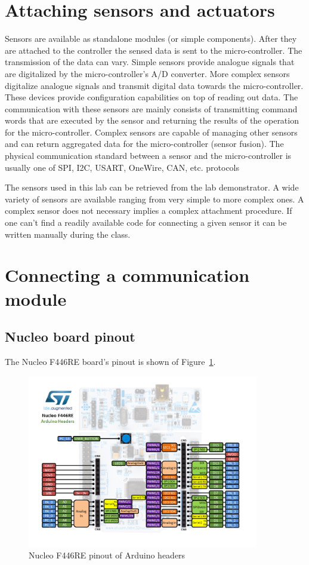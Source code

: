 \documentclass[a4paper]{article}
\begin{document}
\section{Attaching sensors and actuators}

Sensors are available as standalone modules (or simple components). After they are attached to the controller the
sensed data is sent to the micro-controller. The transmission of the data can vary. Simple sensors provide analogue
signals that are digitalized by the micro-controller's A/D converter. More complex sensors digitalize analogue signals
and transmit digital data towards the micro-controller. These devices provide configuration capabilities on top of
reading out data. The communication with these sensors are mainly consists of transmitting command words that are
executed by the sensor and returning the results of the operation for the micro-controller. Complex sensors are capable
of managing other sensors and can return aggregated data for the micro-controller (sensor fusion). The physical
communication standard between a sensor and the micro-controller is usually one of SPI, I2C, USART, OneWire, CAN, etc.
protocols

The sensors used in this lab can be retrieved from the lab demonstrator. A wide variety of sensors are available
ranging from very simple to more complex ones. A complex sensor does not necessary implies a complex attachment
procedure. If one can't find a readily available code for connecting a given sensor it can be written manually during
the class.

\section{Connecting a communication module}

\subsection{Nucleo board pinout}

The Nucleo F446RE board's pinout is shown of Figure~\ref{fig:nucleo-pinout}.

\begin{figure}[H]
    \centering
    \includegraphics[width=0.9\textwidth]{figures/nucleo-pinout.png}
    \caption{Nucleo F446RE pinout of Arduino headers}
    \label{fig:nucleo-pinout}
\end{figure}
\end{document}
